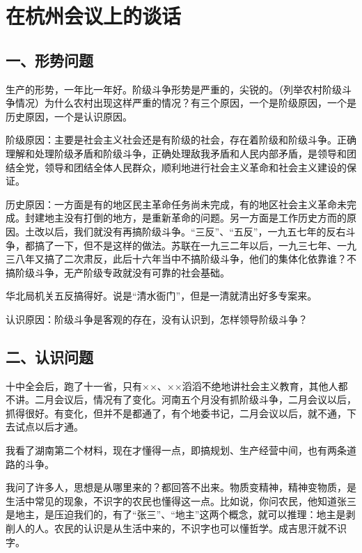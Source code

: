 \section[在杭州会议上的谈话（一九六三年五月）]{在杭州会议上的谈话}


\subsection{一、形势问题}

生产的形势，一年比一年好。阶级斗争形势是严重的，尖锐的。（列举农村阶级斗争情况）为什么农村出现这样严重的情况？有三个原因，一个是阶级原因，一个是历史原因，一个是认识原因。

阶级原因：主要是社会主义社会还是有阶级的社会，存在着阶级和阶级斗争。正确理解和处理阶级矛盾和阶级斗争，正确处理敌我矛盾和人民内部矛盾，是领导和团结全党，领导和团结全体人民群众，顺利地进行社会主义革命和社会主义建设的保证。

历史原因：一方面是有的地区民主革命任务尚未完成，有的地区社会主义革命未完成。封建地主没有打倒的地方，是重新革命的问题。另一方面是工作历史方而的原因。土改以后，我们就没有再搞阶级斗争。“三反”、“五反”，一九五七年的反右斗争，都搞了一下，但不是这样的做法。苏联在一九三二年以后，一九三七年、一九三八年又搞了二次肃反，此后十六年当中不搞阶级斗争，他们的集体化依靠谁？不搞阶级斗争，无产阶级专政就没有可靠的社会基础。

华北局机关五反搞得好。说是“清水衙门”，但是一清就清出好多专案来。

认识原因：阶级斗争是客观的存在，没有认识到，怎样领导阶级斗争？

\subsection{二、认识问题}

十中全会后，跑了十一省，只有××、××滔滔不绝地讲社会主义教育，其他人都不讲。二月会议后，情况有了变化。河南五个月没有抓阶级斗争，二月会议以后，抓得很好。有变化，但并不是都通了，有个地委书记，二月会议以后，就不通，下去试点以后才通。

我看了湖南第二个材料，现在才懂得一点，即搞规划、生产经营中间，也有两条道路的斗争。

我问了许多人，思想是从哪里来的？都回答不出来。物质变精神，精神变物质，是生活中常见的现象，不识字的农民也懂得这一点。比如说，你问农民，他知道张三是地主，是压迫我们的，有了“张三”、“地主”这两个概念，就可以推理：地主是剥削人的人。农民的认识是从生活中来的，不识字也可以懂哲学。成吉思汗就不识字。

